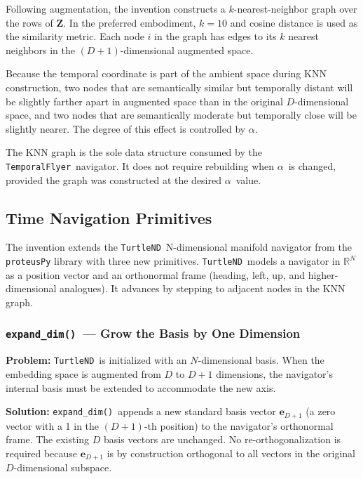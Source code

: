 \documentclass[12pt,letterpaper]{article}
\newcommand{\turtlend}{\texttt{TurtleND}}
\newcommand{\temporalflyer}{\texttt{TemporalFlyer}}
\newcommand{\expanddim}{\texttt{expand\_dim()}}
\newcommand{\alphabar}{$\alpha$}
\begin{document}
Following augmentation, the invention constructs a $k$-nearest-neighbor graph
over the rows of $\mathbf{Z}$. In the preferred embodiment, $k = 10$ and
cosine distance is used as the similarity metric. Each node $i$ in the graph
has edges to its $k$ nearest neighbors in the $(D+1)$-dimensional augmented
space.

Because the temporal coordinate is part of the ambient space during KNN
construction, two nodes that are semantically similar but temporally distant
will be slightly farther apart in augmented space than in the original $D$-dimensional
space, and two nodes that are semantically moderate but temporally close will
be slightly nearer. The degree of this effect is controlled by \alphabar.

The KNN graph is the sole data structure consumed by the \temporalflyer\
navigator. It does not require rebuilding when \alphabar\ is changed, provided
the graph was constructed at the desired \alphabar\ value.

\subsection{Time Navigation Primitives}
\label{sec:primitives}

The invention extends the \turtlend\ N-dimensional manifold navigator from the
\texttt{proteusPy} library with three new primitives. \turtlend\ models a
navigator in $\mathbb{R}^N$ as a position vector and an orthonormal frame
(heading, left, up, and higher-dimensional analogues). It advances by stepping
to adjacent nodes in the KNN graph.

\subsubsection{\expanddim\ --- Grow the Basis by One Dimension}

\textbf{Problem:} \turtlend\ is initialized with an $N$-dimensional basis.
When the embedding space is augmented from $D$ to $D+1$ dimensions, the
navigator's internal basis must be extended to accommodate the new axis.

\textbf{Solution:} \expanddim\ appends a new standard basis vector $\mathbf{e}_{D+1}$
(a zero vector with a 1 in the $(D+1)$-th position) to the navigator's
orthonormal frame. The existing $D$ basis vectors are unchanged. No
re-orthogonalization is required because $\mathbf{e}_{D+1}$ is by construction
orthogonal to all vectors in the original $D$-dimensional subspace.
\end{document}
